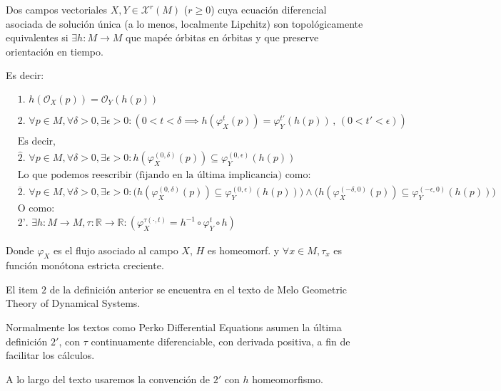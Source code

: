 \begin{defn}
	Dos campos vectoriales $X,Y\in \mathcal{X}^r(M)$ ($r\geq 0$) cuya ecuación diferencial asociada de solución única (a lo menos, localmente Lipchitz) son topológicamente equivalentes si $\exists h: M\to M$ que mapée órbitas en órbitas y que preserve orientación en tiempo.
	
	Es decir:
	
	\begin{align*}
		&\text{1. }h(\mathcal{O}_X(p))=\mathcal{O}_Y(h(p))\\
		\\
		&\text{2. } \forall p \in M, \forall \delta>0,\exists \epsilon>0: (0<t<\delta \implies h(\varphi_X^t(p)) = \varphi_Y^{t'}(h(p))\, , \, (0<t'<\epsilon))\\
		\\
		&\text{Es decir, } \\
		&\text{$\hat{2}$. }\forall p \in M, \forall \delta>0,\exists \epsilon>0: h(\varphi_X^{(0,\delta)}(p))\subseteq  \varphi_Y^{(0,\epsilon)}(h(p))\\
		&\text{Lo que podemos reescribir (fijando en la última implicancia) como: } \\
		&\text{$\overline{2}$. }\forall p \in M, \forall \delta>0,\exists \epsilon>0: \bigg(h(\varphi_X^{(0,\delta)}(p))\subseteq  \varphi_Y^{(0,\epsilon)}(h(p))\bigg)\land\bigg(h(\varphi_X^{(-\delta,0)}(p))\subseteq  \varphi_Y^{(-\epsilon,0)}(h(p))\bigg)\\
		&\text{O como: } \\
		&\text{2'. }\exists h:M \to M, \tau:\mathbb{R}\to \mathbb{R}: (\varphi_X^{\tau(\cdot,t)} = h^{-1}\circ \varphi_Y^t\circ h)
	\end{align*}
	
	Donde $\varphi_X$ es el flujo asociado al campo $X$, $H$ es homeomorf. y  $\forall x \in M, \tau_x$ es función monótona estricta creciente.
\end{defn}

\begin{rmrk}
	El item $2$ de la definición anterior se encuentra en el texto de Melo Geometric Theory of Dynamical Systems.
	
	Normalmente los textos como Perko Differential Equations asumen la última definición $2'$, con $\tau$ continuamente diferenciable, con derivada positiva, a fin de facilitar los cálculos. 
	
	A lo largo del texto usaremos la convención de $2'$ con $h$ homeomorfismo.
\end{rmrk}


